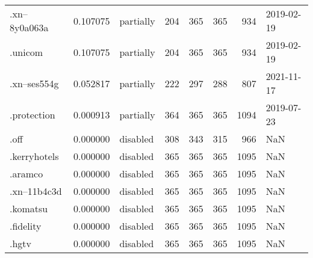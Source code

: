 \begin{tabular}{lrlrrrrl}
.xn--8y0a063a             &          0.107075 &       partially &                         204 &                         365 &                         365 &                 934 &           2019-02-19 \\
.unicom                   &          0.107075 &       partially &                         204 &                         365 &                         365 &                 934 &           2019-02-19 \\
.xn--ses554g              &          0.052817 &       partially &                         222 &                         297 &                         288 &                 807 &           2021-11-17 \\
.protection               &          0.000913 &       partially &                         364 &                         365 &                         365 &                1094 &           2019-07-23 \\
.off                      &          0.000000 &        disabled &                         308 &                         343 &                         315 &                 966 &                  NaN \\
.kerryhotels              &          0.000000 &        disabled &                         365 &                         365 &                         365 &                1095 &                  NaN \\
.aramco                   &          0.000000 &        disabled &                         365 &                         365 &                         365 &                1095 &                  NaN \\
.xn--11b4c3d              &          0.000000 &        disabled &                         365 &                         365 &                         365 &                1095 &                  NaN \\
.komatsu                  &          0.000000 &        disabled &                         365 &                         365 &                         365 &                1095 &                  NaN \\
.fidelity                 &          0.000000 &        disabled &                         365 &                         365 &                         365 &                1095 &                  NaN \\
.hgtv                     &          0.000000 &        disabled &                         365 &                         365 &                         365 &                1095 &                  NaN \\

\end{tabular}
